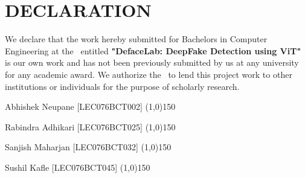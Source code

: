 \section*{DECLARATION}

We declare that the work hereby submitted for Bachelors in Computer Engineering at the \thecampus \ entitled \textbf{"DefaceLab:  DeepFake Detection using ViT"} is our own work and has not been previously submitted by us at any university for any academic award.
We authorize the \thecampus \ to lend this project work
to other institutions or individuals for the purpose of scholarly research.

\vspace{1cm}
\noindent Abhishek Neupane [LEC076BCT002] \space{}\space{}\space{}\space{}\space{}\space{}  \line(1,0){150}\\
\vspace{0.3cm}

\noindent Rabindra Adhikari [LEC076BCT025] \space{}\space{}\space{}\space{}\space{}\space{}\space{} \line(1,0){150} \\
\vspace{0.3cm}

\noindent Sanjish Maharjan [LEC076BCT032]\space{}\space{}\space{}\space{}\space{}\space{}\space{}\space{}\space{} \line(1,0){150} \\
\vspace{0.3cm}

\noindent Sushil Kafle [LEC076BCT045]\space{}\space{}\space{}\space{}\space{}\space{}\space{}\space{} \space{}\space{}\space{}\space{}\space{}\space{}\space{}\space{}\space{}\line(1,0){150}\\


\vspace{0.7cm}
\noindent \thedate \\

